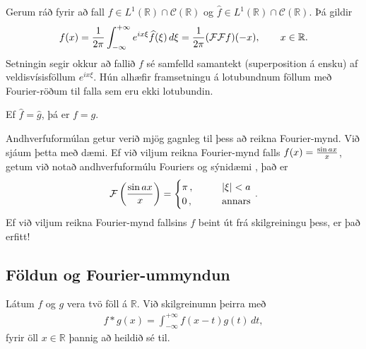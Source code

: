 \documentclass[a4paper,10pt,icelandic]{sphinxmanual}
\begin{document}

Gerum ráð fyrir að fall \(f\in L^1(\mathbb R)\cap \mathcal{C}(\mathbb R)\) og \(\widehat{f}\in L^1(\mathbb R)\cap \mathcal{C}(\mathbb R)\). Þá gildir
\begin{equation*}
\begin{split}f(x) =\dfrac 1{2\pi}\int_{-\infty}^{+\infty}e^{ix\xi}\widehat f(\xi) \,
d\xi = \dfrac 1{2\pi}({{\cal F}}{{\cal F}}f)(-x), \qquad x\in {{\mathbb  R}}.\end{split}
\end{equation*}
Setningin segir okkur að fallið \(f\) sé samfelld samantekt (superposition á ensku) af veldisvísisföllum \(e^{ix\xi}\). Hún alhæfir framsetningu á lotubundnum föllum með Fourier-röðum til falla sem eru ekki lotubundin.


Ef \(\widehat{f}=\widehat{g}\), þá er \(f=g\).


Andhverfuformúlan getur verið mjög gagnleg til þess að reikna Fourier-mynd. Við sjáum þetta með dæmi.
Ef við viljum reikna Fourier-mynd falls \(f(x)={\sin a x\over x}\), getum við notað andhverfuformúlu Fouriers og sýnidæmi {\hyperref[\detokenize{Kafli04:example1}]{}}, það er
\begin{equation*}
\begin{split}\mathcal{F}\left({\sin a x\over x}\right) = \begin{cases} \pi\,, \qquad &|\xi|<a\\ 0\,, \qquad & \text{annars} \end{cases}\,.\end{split}
\end{equation*}
Ef við viljum reikna Fourier-mynd fallsins \(f\) beint út frá skilgreiningu þess, er það erfitt!


\subsection{Földun og Fourier-ummyndun}
\label{\detokenize{Kafli04:foldun-og-fourier-ummyndun}}

Látum \(f\) og \(g\) vera tvö föll á \(\mathbb  R\). Við skilgreinumn  þeirra með
\begin{equation*}
\begin{split}f\ast g(x)= \int_{-\infty}^{+\infty}f(x-t)g(t) \, dt,\end{split}
\end{equation*}
fyrir öll \(x\in {{\mathbb  R}}\) þannig að heildið sé til.
\end{document}
